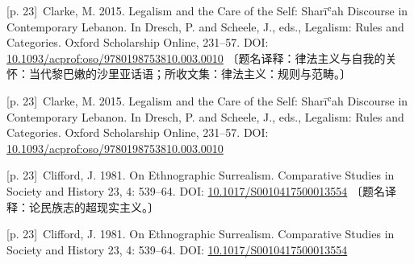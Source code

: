 \documentclass[10pt,a4paper]{article}
\begin{document}
\noindent\begin{minipage}{\textwidth}\begin{minipage}[t]{\dimexpr.5\textwidth-4mm\relax}\noindent\begin{minipage}[t]{\linewidth}{\scriptsize\color{gray} [p. 23]}\ Clarke, M. 2015. Legalism and the Care of the Self: Sharīʿah Discourse in Contemporary Lebanon. In Dresch, P. and Scheele, J., eds., Legalism: Rules and Categories. Oxford Scholarship Online, 231–57. DOI: \url{10.1093/acprof:oso/9780198753810.003.0010} 〔题名译释：律法主义与自我的关怀：当代黎巴嫩的沙里亚话语；所收文集：律法主义：规则与范畴。〕\par\end{minipage}\par\end{minipage}\hfill\begin{minipage}[t]{\dimexpr.5\textwidth-4mm\relax}\noindent\begin{minipage}[t]{\linewidth}{\scriptsize\color{gray} [p. 23]}\ Clarke, M. 2015. Legalism and the Care of the Self: Sharīʿah Discourse in Contemporary Lebanon. In Dresch, P. and Scheele, J., eds., Legalism: Rules and Categories. Oxford Scholarship Online, 231–57. DOI: \url{10.1093/acprof:oso/9780198753810.003.0010}\par\end{minipage}\par\end{minipage}\end{minipage}\par
\noindent\begin{minipage}{\textwidth}\begin{minipage}[t]{\dimexpr.5\textwidth-4mm\relax}\noindent\begin{minipage}[t]{\linewidth}{\scriptsize\color{gray} [p. 23]}\ Clifford, J. 1981. On Ethnographic Surrealism. Comparative Studies in Society and History 23, 4: 539–64. DOI: \url{10.1017/S0010417500013554} 〔题名译释：论民族志的超现实主义。〕\par\end{minipage}\par\end{minipage}\hfill\begin{minipage}[t]{\dimexpr.5\textwidth-4mm\relax}\noindent\begin{minipage}[t]{\linewidth}{\scriptsize\color{gray} [p. 23]}\ Clifford, J. 1981. On Ethnographic Surrealism. Comparative Studies in Society and History 23, 4: 539–64. DOI: \url{10.1017/S0010417500013554}\par\end{minipage}\par\end{minipage}\end{minipage}\par
\end{document}

